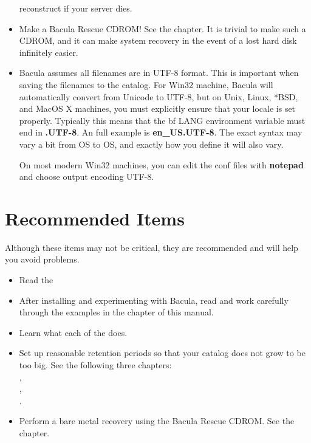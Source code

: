 \begin{itemize}
   reconstruct if your server dies.
\item Make a Bacula Rescue CDROM! See the 
    chapter. It is trivial to  make such a CDROM,
   and it can make system recovery in the event of  a lost hard disk infinitely
   easier. 
\item Bacula assumes all filenames are in UTF-8 format. This is important 
   when saving the filenames to the catalog. For Win32 machine, Bacula will
   automatically convert from Unicode to UTF-8, but on Unix, Linux, *BSD,
   and MacOS X machines, you must explicitly ensure that your locale is set
   properly. Typically this means that the {bf LANG} environment variable
   must end in {\bf .UTF-8}. An full example is {\bf en\_US.UTF-8}. The
   exact syntax may vary a bit from OS to OS, and exactly how you define it
   will also vary.

   On most modern Win32 machines, you can edit the conf files with {\bf
   notepad} and choose output encoding UTF-8.
\end{itemize}

\section{Recommended Items}

Although these items may not be critical, they are recommended and will help
you avoid problems. 

\begin{itemize}
\item Read the  
\item After installing and experimenting with Bacula, read and work carefully 
   through the examples in the 
    chapter  of this manual. 
\item Learn what each of the  
   does. 
\item Set up reasonable retention periods so that your catalog does not  grow
   to be too big. See the following three chapters:\\
   ,\\
   ,\\
   . 
\item Perform a bare metal recovery using the Bacula Rescue CDROM.  See the 
    chapter. 
\end{itemize}

